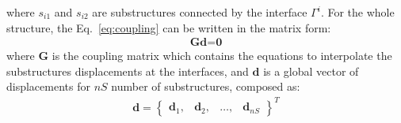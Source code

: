 \documentclass[materials,article,submit,moreauthors,pdftex]{Definitions/mdpi}
\begin{document}
where \(s_{i1}\) and \(s_{i2}\) are substructures connected by the interface \(\Gamma^i\). For the whole structure, the Eq.~\ref{eq:coupling} can be written in the matrix form:
\begin{eqnarray}
\textbf{G}\textbf{d}=\textbf{0}
\label{eq:cond_disp}
\end{eqnarray}
where \textbf{G} is the coupling matrix which contains the equations to interpolate the substructures displacements at the interfaces, and \(\textbf{d}\) is a global vector of displacements for \(nS\) number of substructures, composed as:
\begin{eqnarray}
\textbf{d} = \left\{\begin{array}{cccc}
\textbf{d}_1, & \textbf{d}_2, &\ldots, & \textbf{d}_{nS}
\end{array}\right\}^T
\label{eq:displacements}
\end{eqnarray}
\end{document}
